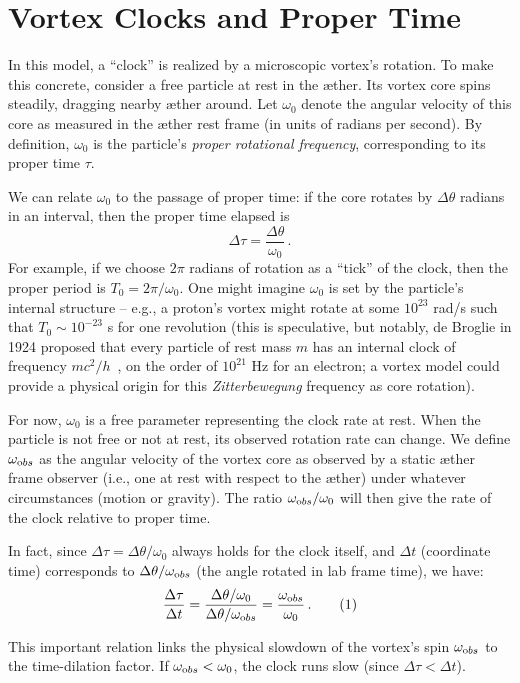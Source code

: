 
\section{Vortex Clocks and Proper Time}

In this model, a “clock” is realized by a microscopic vortex’s rotation. To make this concrete, consider a free particle at rest in the æther. Its vortex core spins steadily, dragging nearby æther around. Let $\omega_0$ denote the angular velocity of this core as measured in the æther rest frame (in units of radians per second). By definition, $\omega_0$ is the particle’s \emph{proper rotational frequency}, corresponding to its proper time $\tau$.

We can relate $\omega_0$ to the passage of proper time: if the core rotates by $\Delta \theta$ radians in an interval, then the proper time elapsed is
\[
\Delta \tau = \frac{\Delta \theta}{\omega_0} \,.
\]
For example, if we choose $2\pi$ radians of rotation as a “tick” of the clock, then the proper period is $T_0 = 2\pi/\omega_0$. One might imagine $\omega_0$ is set by the particle’s internal structure – e.g., a proton’s vortex might rotate at some $10^{23}$ rad/s such that $T_0 \sim 10^{-23}$ s for one revolution (this is speculative, but notably, de Broglie in 1924 proposed that every particle of rest mass $m$ has an internal clock of frequency $mc^2/h$~\cite{deBroglie1924-frequency}, on the order of $10^{21}$ Hz for an electron; a vortex model could provide a physical origin for this \emph{Zitterbewegung} frequency as core rotation).

For now, $\omega_0$ is a free parameter representing the clock rate at rest. When the particle is not free or not at rest, its observed rotation rate can change. We define $\omega_{\textrm obs}$ as the angular velocity of the vortex core as observed by a static æther frame observer (i.e., one at rest with respect to the æther) under whatever circumstances (motion or gravity). The ratio $\omega_{\textrm obs}/\omega_0$ will then give the rate of the clock relative to proper time.

In fact, since $\Delta \tau = \Delta \theta / \omega_0$ always holds for the clock itself, and $\Delta t$ (coordinate time) corresponds to $\Delta \theta / \omega_{\textrm obs}$ (the angle rotated in lab frame time), we have:
\[
\frac{\Delta \tau}{\Delta t} = \frac{\Delta \theta / \omega_0}{\Delta \theta / \omega_{\textrm obs}} = \frac{\omega_{\textrm obs}}{\omega_0} \,. \tag{1}
\]

This important relation links the physical slowdown of the vortex’s spin $\omega_{\textrm obs}$ to the time-dilation factor. If $\omega_{\textrm obs} < \omega_0$, the clock runs slow (since $\Delta \tau < \Delta t$).

